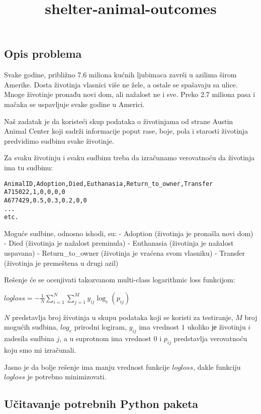 \documentclass[11pt]{article}
\title{shelter-animal-outcomes}
\begin{document}
    
    \maketitle
    
    

    
    \hypertarget{opis-problema}{%
\subsection{Opis problema}\label{opis-problema}}

Svake godine, približno 7.6 miliona kućnih ljubimaca završi u azilima
širom Amerike. Dosta životinja vlasnici više ne žele, a ostale se
spašavaju sa ulice. Mnoge životinje pronađu novi dom, ali nažalost ne i
sve. Preko 2.7 miliona pasa i mačaka se uspavljuje svake godine u
Americi.

Naš zadatak je da koristeći skup podataka o životinjama od strane Austin
Animal Center koji sadrži informacije poput rase, boje, pola i starosti
životinja predvidimo sudbinu svake životinje.

Za svaku životinju i svaku sudbinu treba da izračunamo verovatnoću da
životinja ima tu sudbinu:

\begin{verbatim}
AnimalID,Adoption,Died,Euthanasia,Return_to_owner,Transfer
A715022,1,0,0,0,0
A677429,0.5,0.3,0.2,0,0
...
etc.
\end{verbatim}

Moguće sudbine, odnosno ishodi, su: - Adoption (životinja je pronašla
novi dom) - Died (životinja je nažalost preminula) - Euthanasia
(životinja je nažalost uspavana) - Return\_to\_owner (životinja je
vraćena svom vlasniku) - Transfer (životinja je premeštena u drugi azil)

Rešenje će se ocenjivati takozvanom multi-class logarithmic loss
funkcijom:

\(logloss = -\frac{1}{N} \sum_{i=1}^{N} \sum_{j=1}^{M} y_{ij} \log_e{(p_{ij})}\)

\(N\) predstavlja broj životinja u skupu podataka koji se koristi za
testiranje, \(M\) broj mogućih sudbina, \(log_e\) prirodni logiram,
\(y_{ij}\) ima vrednost \(1\) ukoliko је životinju \(i\) zadesila
sudbina \(j\), a u suprotnom ima vrednost \(0\) i \(p_{ij}\) predstavlja
verovatnoću koju smo mi izračunali.

Jasno je da bolje rešenje ima manju vrednost funkcije \(logloss\), dakle
funkciju \(logloss\) je potrebno minimizovati.

    \hypertarget{uux10ditavanje-potrebnih-python-paketa}{%
\subsection{Učitavanje potrebnih Python
paketa}\label{uux10ditavanje-potrebnih-python-paketa}}
\end{document}
